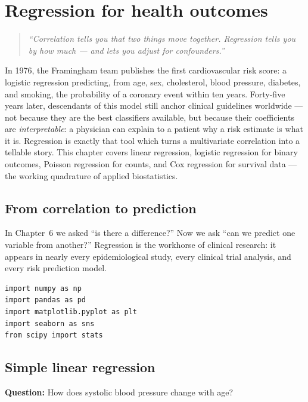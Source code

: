 \chapter{Regression for health outcomes}
\label{ch:regression}

\begin{quote}
\emph{``Correlation tells you that two things move together. Regression tells you by how much --- and lets you adjust for confounders.''}
\end{quote}

In 1976, the Framingham team publishes the first cardiovascular risk score: a logistic regression predicting, from age, sex, cholesterol, blood pressure, diabetes, and smoking, the probability of a coronary event within ten years. Forty-five years later, descendants of this model still anchor clinical guidelines worldwide --- not because they are the best classifiers available, but because their coefficients are \emph{interpretable}: a physician can explain to a patient why a risk estimate is what it is. Regression is exactly that tool which turns a multivariate correlation into a tellable story. This chapter covers linear regression, logistic regression for binary outcomes, Poisson regression for counts, and Cox regression for survival data --- the working quadrature of applied biostatistics.

\section{From correlation to prediction}

In Chapter~6 we asked ``is there a difference?'' Now we ask ``can we predict one variable from another?'' Regression is the workhorse of clinical research: it appears in nearly every epidemiological study, every clinical trial analysis, and every risk prediction model.

\begin{verbatim}
import numpy as np
import pandas as pd
import matplotlib.pyplot as plt
import seaborn as sns
from scipy import stats
\end{verbatim}

\section{Simple linear regression}

\textbf{Question:} How does systolic blood pressure change with age?


